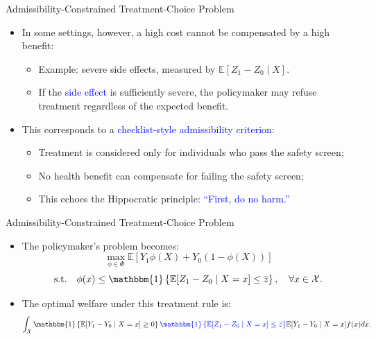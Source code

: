 \documentclass[aspectratio=169,xcolor=dvipsnames]{beamer}
\begin{document}
\begin{frame}{Admissibility-Constrained Treatment-Choice Problem}
    \begin{itemize}
        \item In some settings, however, a high cost cannot be compensated by a high benefit:
            \begin{itemize}
                \item[-] Example: severe side effects, measured by
                $\mathbb{E}[Z_1-Z_0\mid X]$.
                \item[-] If the \textcolor{blue}{side effect} is sufficiently severe, the policymaker may refuse treatment regardless of the expected benefit.
            \end{itemize}
        \bigskip

        \item This corresponds to a \textcolor{blue}{checklist-style admissibility criterion}:
            \begin{itemize}
                \item[-] Treatment is considered only for individuals who pass the safety screen;
                \item[-] No health benefit can compensate for failing the safety screen;
                \item[-] This echoes the Hippocratic principle: \textcolor{blue}{``First, do no harm.''}
            \end{itemize}
    \end{itemize}
\end{frame}

\begin{frame}{Admissibility-Constrained Treatment-Choice Problem}
    \begin{itemize}
        \item The policymaker's problem becomes:
            \[
            \max_{\phi \in \Phi}
            \mathbb{E}\left[
            Y_1\phi(X)+Y_0(1-\phi(X))
            \right]
            \]
            \[
            \text{s.t.}\quad
            \phi(x)
            \leq
            \mathbbm{1}\left\{
            \mathbb{E}[Z_1-Z_0 \mid X=x]\leq \bar z
            \right\},
            \quad \forall x\in\mathcal{X}.
            \]

        \item The optimal welfare under this treatment rule is:
            \[
            \int_\mathcal{X}
            \mathbbm{1}\left\{\mathbb{E}[Y_1-Y_0\mid X=x]\geq 0\right\}
            \textcolor{blue}{
            \mathbbm{1}\left\{\mathbb{E}[Z_1-Z_0\mid X=x]\leq \bar z\right\}
            }
            \mathbb{E}[Y_1-Y_0\mid X=x]
            f(x)dx.
            \]
    \end{itemize}
\end{frame}
\end{document}
